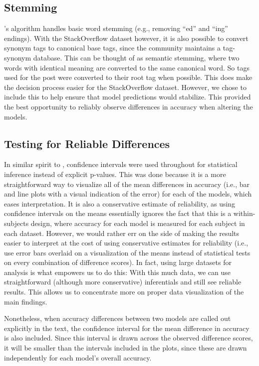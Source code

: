 \documentclass[man,floatsintext,donotrepeattitle]{apa6}
\begin{document}
\subsection{Stemming}

\textcite{Owoputi2013}'s algorithm handles basic word stemming (e.g., removing ``ed'' and ``ing'' endings).
With the StackOverflow dataset however, it is also possible to convert synonym tags to canonical base tags, since the community maintains a tag-synonym database.
This can be thought of as semantic stemming, where two words with identical meaning are converted to the same canonical word.
So tags used for the post were converted to their root tag when possible.
This does make the decision process easier for the StackOverflow dataset.
However, we chose to include this to help ensure that model predictions would stabilize.
This provided the best opportunity to reliably observe differences in accuracy when altering the models. 

\subsection{Testing for Reliable Differences}

In similar spirit to \textcites{masson2003using, tryon2001evaluating}, confidence intervals were used throughout for statistical inference instead of explicit p-values.
This was done because it is a more straightforward way to visualize all of the mean differences in accuracy (i.e., bar and line plots with a visual indication of the error) for each of the models, which eases interpretation.
It is also a conservative estimate of reliability, as using confidence intervals on the means essentially ignores the fact that this is a within-subjects design, where accuracy for each model is measured for each subject in each dataset.
However, we would rather err on the side of making the results easier to interpret at the cost of using conservative estimates for reliability
(i.e., use error bars overlaid on a visualization of the means instead of statistical tests on every combination of difference scores).
In fact, using large datasets for analysis is what empowers us to do this:
With this much data, we can use straightforward (although more conservative) inferentials and still see reliable results.
This allows us to concentrate more on proper data visualization of the main findings.

Nonetheless, when accuracy differences between two models are called out explicitly in the text, the confidence interval for the mean difference in accuracy is also included.
Since this interval is drawn across the observed difference scores, it will be smaller than the intervals included in the plots, since these are drawn independently for each model's overall accuracy.
\end{document}
